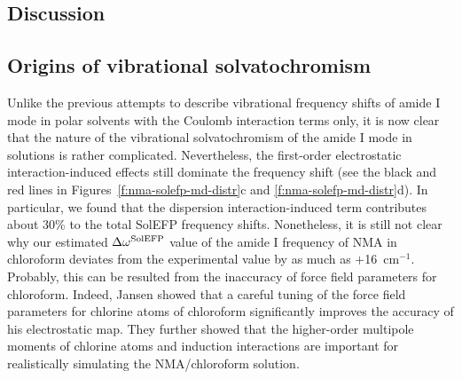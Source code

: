 \documentclass[a4paper,titlepage,twoside,fleqn,12pt]{book}
\begin{document}
\begin{refsection}
\section{Discussion}

\subsection{Origins of vibrational solvatochromism\label{s:amide-I-discuss-origins}}

Unlike the previous attempts to describe vibrational
frequency shifts of amide I mode in polar solvents with the
Coulomb interaction terms only, it is now clear that the nature
of the vibrational solvatochromism of the amide I mode in
solutions is rather complicated. Nevertheless, the first\hyp{}order
electrostatic interaction\hyp{}induced effects still dominate the
frequency shift (see the black and red lines in Figures~\ref{f:nma-solefp-md-distr}c 
and \ref{f:nma-solefp-md-distr}d). 
In particular, we found that the dispersion interaction\hyp{}induced
term contributes about 30\% to the total SolEFP
frequency shifts. Nonetheless, it is still not clear why our
estimated $\Delta\omega^{\rm SolEFP}$ value of the amide I frequency of NMA in
chloroform deviates from the experimental value by as much
as +16~cm$^{-1}$. Probably, this can be resulted from the inaccuracy
of force field parameters for chloroform. Indeed, Jansen \citep{Jansen.JPCB.2014}
showed that a careful tuning of the force field parameters
for chlorine atoms of chloroform significantly improves the
accuracy of his electrostatic map. They further showed that
the higher\hyp{}order multipole moments of chlorine atoms and
induction interactions are important for realistically simulating
the NMA/chloroform solution.


\end{refsection}
\end{document}
